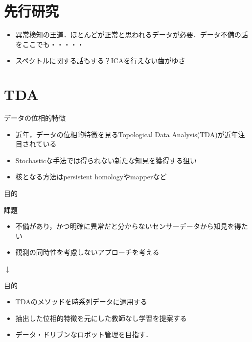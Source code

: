 \documentclass[dvipdfmx,cjk]{beamer}
\theoremstyle{example}
\begin{document}
\section{先行研究}
\begin{frame}
\begin{itemize}
\setlength{\itemsep}{8mm}
\item 異常検知の王道．ほとんどが正常と思われるデータが必要．データ不備の話をここでも・・・・・
\item スペクトルに関する話もする？ICAを行えない歯がゆさ
\end{itemize}
\end{frame}

\section{TDA}             %
\begin{frame}{データの位相的特徴}
\begin{itemize}
\setlength{\itemsep}{8mm}
\item 近年，データの位相的特徴を見るTopological Data Analysis(TDA)が近年注目されている
\item Stochasticな手法では得られない新たな知見を獲得する狙い
\item 核となる方法はpersistent homologyやmapperなど
\end{itemize}
\end{frame}

\begin{frame}{目的}
\begin{alertblock}{課題}
\begin{itemize}
\item 不備があり，かつ明確に異常だと分からないセンサーデータから知見を得たい
\item 観測の同時性を考慮しないアプローチを考える
\end{itemize}
\end{alertblock}
\centerline{\Huge$\downarrow$}
\begin{exampleblock}{目的}
\begin{itemize}
\item TDAのメソッドを時系列データに適用する
\item 抽出した位相的特徴を元にした教師なし学習を提案する
\item データ・ドリブンなロボット管理を目指す．
\end{itemize}
\end{exampleblock}
\end{frame}
\end{document}
